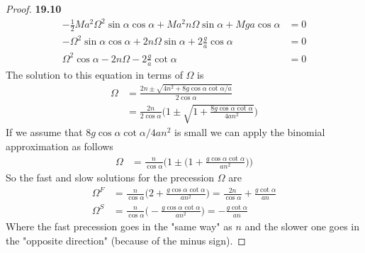 \documentclass[11pt]{article}
\theoremstyle{definition}
\begin{document}
\begin{proof}{\textbf{19.10}}
\begin{align*}
        -\frac{1}{2}Ma^2\Omega^2\sin\alpha\cos\alpha
        + Ma^2n\Omega\sin\alpha + Mga\cos\alpha &= 0\\
        -\Omega^2\sin\alpha\cos\alpha
        + 2n\Omega\sin\alpha + 2\frac{g}{a}\cos\alpha &= 0\\
        \Omega^2\cos\alpha - 2n\Omega - 2\frac{g}{a}\cot\alpha &= 0
    \end{align*}
    The solution to this equation in terms of $\Omega$ is
    \begin{align*}
        \Omega &= \frac{2n \pm \sqrt{4n^2 + 8g\cos\alpha\cot\alpha/a}}{2\cos\alpha}\\
        &= \frac{2n}{2\cos\alpha}
        \bigg(1 \pm \sqrt{1 + \frac{8g\cos\alpha\cot\alpha}{4an^2}}\bigg)
    \end{align*}
    If we assume that $8g\cos\alpha\cot\alpha/4an^2$ is small we can apply the
    binomial approximation as follows
    \begin{align*}
        \Omega &= \frac{n}{\cos\alpha}
        \bigg(1 \pm \bigg(1 + \frac{g\cos\alpha\cot\alpha}{an^2}\bigg)\bigg)
    \end{align*}
    So the fast and slow solutions for the precession $\Omega$ are
    \begin{align*}
        \Omega^F &= \frac{n}{\cos\alpha}
        \bigg(2 + \frac{g\cos\alpha\cot\alpha}{an^2}\bigg)
        = \frac{2n}{\cos\alpha} + \frac{g\cot\alpha}{an}\\
        \Omega^S &= \frac{n}{\cos\alpha}
        \bigg(-\frac{g\cos\alpha\cot\alpha}{an^2}\bigg)
        = -\frac{g\cot\alpha}{an}
    \end{align*}
    Where the fast precession goes in the "same way" as $n$ and the slower one
    goes in the "opposite direction" (because of the minus sign).
\end{proof}
\cleardoublepage
\end{document}
